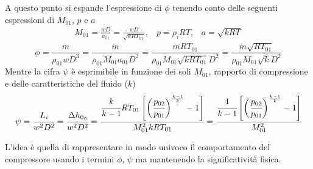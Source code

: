 A questo punto si espande l'espressione di $\phi$ tenendo conto delle seguenti espressioni di $M_{01}$, $p$ e $a$
\begin{align*}
M_{01}=\frac{w D}{a_{01}}= \frac{w D}{\sqrt{k R T_{01}}}, \;\;\;p = \rho_i RT, \;\;\; a = \sqrt{k R T}
\end{align*}
\begin{equation}
\phi = \frac{\dot{m}}{\rho_{01} w D^3} = \frac{\dot{m}}{\rho_{01} M_{01} a_{01} D^2} = \frac{\dot{m} R T_{01}}{\rho_{01} M_{01} \sqrt{k R T_{01}} D^2} = \frac{\dot{m} \sqrt{R T_{01}}}{\rho_{01} M_{01} \sqrt{k} D^2}
\end{equation}
Mentre la cifra $\psi$ è esprimibile in funzione dei soli $M_{01}$, rapporto di compressione e delle caratteristiche del fluido ($k$)
\begin{equation}
\psi = \cfrac{L_i}{w^2 D^2} = \cfrac{\Delta h_{0s}}{w^ 2 D^2} = \cfrac{\cfrac{k}{k-1} R T_{01}\left[ \bigg( \cfrac{p_{02}}{p_{01}} \bigg)^{\frac{k-1}{k}}-1\right]}{M_{01}^2 k R T_{01}} = \cfrac{\cfrac{1}{k-1} \left[ \bigg( \cfrac{p_{02}}{p_{01}} \bigg)^{\frac{k-1}{k}}-1\right]}{M_{01}^2 }
\end{equation}

L'idea è quella di rappresentare in modo univoco il comportamento del compressore usando i termini $\phi$, $\psi$ ma mantenendo la significatività fisica.

